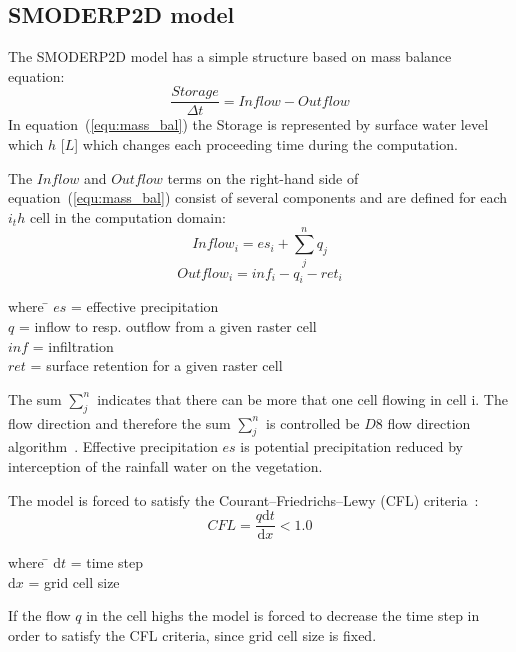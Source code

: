 \subsection{SMODERP2D model}
The SMODERP2D model has a simple structure based on mass balance equation:
\begin{equation}\label{equ:mass_bal}
    \frac{Storage}{\Delta t} = \nonumber  
    Inflow - Outflow
\end{equation}
In equation~(\ref{equ:mass_bal}) the Storage is represented by
surface water level which $h$ [$L$] which changes each proceeding time
during the computation.

The $Inflow$ and $Outflow$ terms on the right-hand side of
equation~(\ref{equ:mass_bal}) consist of several components and are
defined for each $i_th$ cell in the computation domain:
\begin{equation}\label{equ:inflow}
    Inflow_i = es_{i} + \sum_j^n q_{j}
\end{equation}
\begin{equation}\label{equ:outflow}
    Outflow_i = inf_{i} - q_{i} - ret_i
\end{equation}
\begin{tabbing} 
where \hspace{0.6cm} \= $es$ = effective precipitation\\
\> $q$ = inflow to resp. outflow from a given raster cell\\
\> $inf$ = infiltration\\
\> $ret$ = surface retention for a given raster cell
\end{tabbing}
The sum $\sum_j^n$ indicates that there can be more that one cell
flowing in cell i. The flow direction and therefore the sum $\sum_j^n$
is controlled be $D8$ flow direction algorithm~\cite{ocallaghan1984}.  Effective
precipitation $es$ is potential precipitation reduced by
interception of the rainfall water on the vegetation.

The model is forced to satisfy the Courant–Friedrichs–Lewy (CFL)
criteria~\cite{courant1928}:
\begin{equation}\label{equ:CFL}
    CFL = \frac{q\textrm{d}t}{\textrm{d}x} < 1.0
\end{equation}
\begin{tabbing} 
where \hspace{0.6cm} \= $\textrm{d}t$ = time step\\
\> $\textrm{d}x$ = grid cell size
\end{tabbing}
If the flow $q$ in the cell highs the model is forced to decrease the
time step in order to satisfy the CFL criteria, since grid cell size
is fixed.

